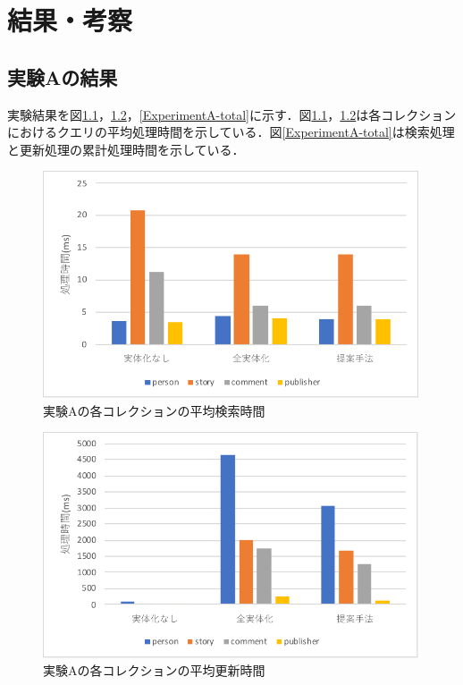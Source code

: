 \documentclass[a4paper,11pt]{ujreport}
\begin{document}
\chapter{結果・考察}
\label{chap:Result}
\section{実験Aの結果}
実験結果を図\ref{ExperimentA-find}，\ref{ExperimentA-update}，\ref{ExperimentA-total}に示す．図\ref{ExperimentA-find}，\ref{ExperimentA-update}は各コレクションにおけるクエリの平均処理時間を示している．図\ref{ExperimentA-total}は検索処理と更新処理の累計処理時間を示している．
\begin{figure}[htbp]
	\begin{center}
		\includegraphics[width=30em]{src/ExperimentA-find.pdf} %
	\end{center}
	\caption{実験Aの各コレクションの平均検索時間}
	\label{ExperimentA-find}
\end{figure}
\begin{figure}[htbp]
	\begin{center}
		\includegraphics[width=30em]{src/ExperimentA-update.pdf} %
	\end{center}
	\caption{実験Aの各コレクションの平均更新時間}
	\label{ExperimentA-update}
\end{figure}
\end{document}
